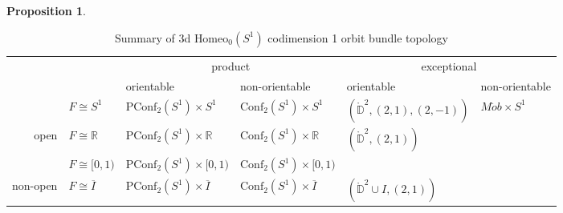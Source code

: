 \documentclass[10pt, oneside]{article}
\newcommand{\R}{\mathbb{R}}
\newcommand{\Z}{\mathbb{Z}}
\newcommand{\homeo}[1][S^1]{\text{Homeo}_0(#1)}
\newcommand{\cl}[1]{\overline{#1}}
\newcommand{\conf}[2][S^1]{\text{Conf}_{#2}(#1)}
\newcommand{\pconf}[2][S^1]{\text{PConf}_{#2}(#1)}
\theoremstyle{definition}
\newtheorem{prop}{Proposition}[section]
\theoremstyle{definition}
\begin{document}
\begin{prop}
\end{prop}
\setlength\extrarowheight{3pt}
\begin{table}[]
\begin{tabular}{rlll|ll}
\multicolumn{1}{l}{}       &                                              & \multicolumn{2}{c|}{product}                                                          & \multicolumn{2}{c}{exceptional}                                                                                 \\
\multicolumn{1}{l}{}       &                                              & \multicolumn{1}{l|}{orientable}                      & non-orientable                 & \multicolumn{1}{l|}{orientable}                                 & non-orientable                                \\ \cline{3-6} 
                           & \multicolumn{1}{l|}{$F\cong S^1$}            & \multicolumn{1}{l|}{$\pconf{2}\times S^1$}           & $\conf{2}\times S^1$           & \multicolumn{1}{l|}{$(\mathring{\mathbb{D}}^2, (2, 1), (2,-1))$} & \multicolumn{1}{l|}{$M\ddot{o}b\times S^1$}   \\ \cline{2-6} 
\multirow{-2}{*}{open}     & \multicolumn{1}{l|}{$F\cong \R$}             & \multicolumn{1}{l|}{$\pconf{2}\times \R$}            & $\conf{2}\times \R$            & \multicolumn{1}{l|}{$(\mathring{\mathbb{D}}^2, (2, 1))$}        & \multicolumn{1}{l|}{\cellcolor[HTML]{EFEFEF}} \\ \hline
                           & \multicolumn{1}{l|}{$F\cong \lbrack 0, 1 )$} & \multicolumn{1}{l|}{$\pconf{2}\times \lbrack 0, 1)$} & $\conf{2}\times \lbrack 0, 1)$ & \multicolumn{1}{l|}{\cellcolor[HTML]{EFEFEF}}                   & \multicolumn{1}{l|}{\cellcolor[HTML]{EFEFEF}} \\ \cline{2-6} 
\multirow{-2}{*}{non-open} & \multicolumn{1}{l|}{$F\cong \cl{I}$}         & \multicolumn{1}{l|}{$\pconf{2}\times \cl{I}$}        & $\conf{2}\times \cl{I}$        & \multicolumn{1}{l|}{$(\mathring{\mathbb{D}}^2\cup I, (2,1))$}   & \multicolumn{1}{l|}{\cellcolor[HTML]{EFEFEF}} \\ \cline{2-6} 
\end{tabular}
\label{table:orbit-bundles}
\caption{Summary of 3d $\homeo$ codimension 1 orbit bundle topology}
\end{table}
\end{document}
